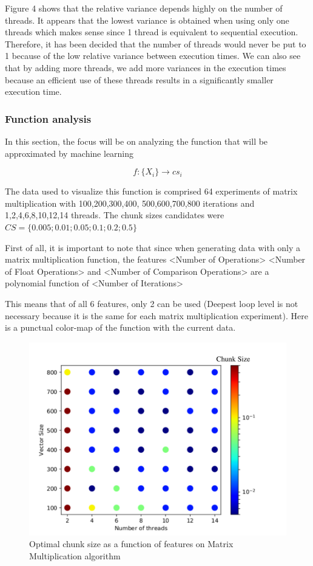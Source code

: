 Figure 4 shows that the relative variance depends highly on the number of threads. It appears that the lowest variance is obtained when using only one threads which makes sense since 1 thread is equivalent to sequential execution. Therefore, it has been decided that the number of threads would never be put to 1 because of the low relative variance between execution times. We can also see that by adding more threads, we add more variances in the execution times because an efficient use of these threads results in a significantly smaller execution time.

\subsubsection{Function analysis}
In this section, the focus will be on analyzing the function that will be approximated by machine learning

$$f:\{X_i\} \rightarrow cs_i$$

The data used to visualize this function is comprised 64 experiments of matrix multiplication with 100,200,300,400, 500,600,700,800 iterations and 1,2,4,6,8,10,12,14 threads. The chunk sizes candidates were $CS=\{0.005; 0.01 ;0.05; 0.1; 0.2; 0.5\}$

First of all, it is important to note that since when generating data with only a matrix multiplication function, the features <Number of Operations> <Number of Float Operations> and <Number of Comparison Operations> are a polynomial function of <Number of Iterations>

This means that of all 6 features, only 2 can be used (Deepest loop level is not necessary because it is the same for each matrix multiplication experiment). Here is a punctual color-map of the function with the current data.

\begin{figure}[H]
	\centering
	\includegraphics[width=120mm]{images/chunk_size_function_matrix.pdf}
	\caption{Optimal chunk size as a function of features on Matrix Multiplication algorithm}
\end{figure}

